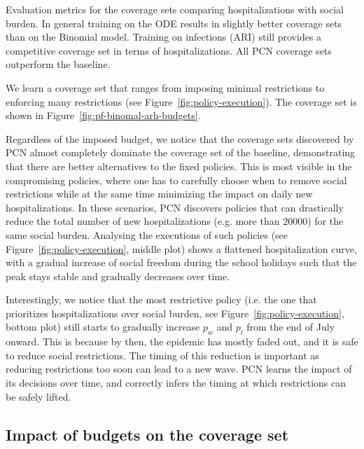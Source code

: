 \documentclass{article}
\begin{document}
\begin{table}[t]
    \centering
    \setlength{\tabcolsep}{0.5em} %
    {\renewcommand{\arraystretch}{1.2}%
    
    }
    \caption{Evaluation metrics for the coverage sets comparing hospitalizations with social burden. In general training on the ODE results in slightly better coverage sets than on the Binomial model. Training on infections (ARI) still provides a competitive coverage set in terms of hospitalizations. All PCN coverage sets outperform the baseline.}
    \label{tab:coverage-set}
  \end{table}

We learn a coverage set that ranges from imposing minimal restrictions to enforcing many restrictions (see Figure~\ref{fig:policy-execution}). The coverage set is shown in Figure~\ref{fig:pf-binomal-arh-budgets}.

Regardless of the imposed budget, we notice that the coverage sets discovered by PCN almost completely dominate the coverage set of the baseline, demonstrating that there are better alternatives to the fixed policies. This is most visible in the compromising policies, where one has to carefully choose when to remove social restrictions while at the same time minimizing the impact on daily new hospitalizations. In these scenarios, PCN discovers policies that can drastically reduce the total number of new hospitalizations (e.g. more than $20000$) for the same social burden. Analysing the executions of such policies (see Figure~\ref{fig:policy-execution}, middle plot) shows a flattened hospitalization curve, with a gradual increase of social freedom during the school holidays such that the peak stays stable and gradually decreases over time.

Interestingly, we notice that the most restrictive policy (i.e. the one that prioritizes hospitalizations over social burden, see Figure~\ref{fig:policy-execution}, bottom plot) still starts to gradually increase $p_w$ and $p_l$ from the end of July onward. This is because by then, the epidemic has mostly faded out, and it is safe to reduce social restrictions. The timing of this reduction is important as reducing restrictions too soon can lead to a new wave. PCN learns the impact of its decisions over time, and correctly infers the timing at which restrictions can be safely lifted.

\subsection{Impact of budgets on the coverage set}
\end{document}
